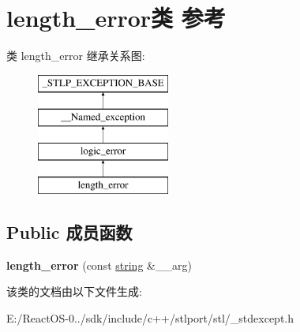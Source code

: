 \hypertarget{classlength__error}{}\section{length\+\_\+error类 参考}
\label{classlength__error}
类 length\+\_\+error 继承关系图\+:\begin{figure}[H]
\begin{center}
\leavevmode
\includegraphics[height=4.000000cm]{classlength__error}
\end{center}
\end{figure}
\subsection*{Public 成员函数}
\begin{DoxyCompactItemize}
\item 
\mbox{\label{classlength__error_a36dec147fa062edcd135f049dd535de8}} 
{\bfseries length\+\_\+error} (const \hyperlink{structstring}{string} \&\+\_\+\+\_\+arg)
\end{DoxyCompactItemize}


该类的文档由以下文件生成\+:\begin{DoxyCompactItemize}
\item 
E\+:/\+React\+O\+S-\/0../sdk/include/c++/stlport/stl/\+\_\+stdexcept.\+h\end{DoxyCompactItemize}

